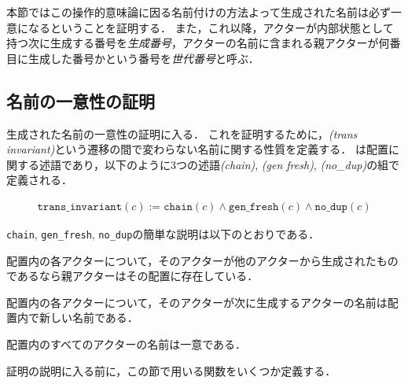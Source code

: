 本節ではこの操作的意味論に因る名前付けの方法よって生成された名前は必ず一意になるということを証明する．
また，これ以降，アクターが内部状態として持つ次に生成する番号を\emph{生成番号}，アクターの名前に含まれる親アクターが何番目に生成した番号かという番号を\emph{世代番号}と呼ぶ．

\subsection{名前の一意性の証明}

生成された名前の一意性の証明に入る．
これを証明するために，\emph{\transinv(trans invariant)}という遷移の間で変わらない名前に関する性質を定義する．
\transinv は配置に関する述語であり，以下のように3つの述語\emph{\chain (chain)}, \emph{\fresh (gen fresh)}, \emph{\nodup (no\_dup)}の組で定義される．

\begin{definition}{\transinv}
\begin{displaymath}
  \begin{array}{l}
    \texttt{trans\_invariant}(c) :=
    \texttt{chain}(c) \wedge \texttt{gen\_fresh}(c) \wedge \texttt{no\_dup}(c)
  \end{array}
\end{displaymath}
\end{definition}

\texttt{chain}, \texttt{gen\_fresh}, \texttt{no\_dup}の簡単な説明は以下のとおりである．

\begin{description}[style=nextline,leftmargin=12pt,parsep=0pt]
\item[\chain]
  配置内の各アクターについて，そのアクターが他のアクターから生成されたものであるなら親アクターはその配置に存在している．
\item[\fresh]
  配置内の各アクターについて，そのアクターが次に生成するアクターの名前は配置内で新しい名前である．
\item[\nodup]
  配置内のすべてのアクターの名前は一意である．
\end{description}

証明の説明に入る前に，この節で用いる関数をいくつか定義する．


